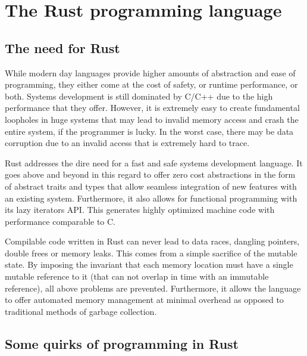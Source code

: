 
\chapter{The Rust programming language} %

\label{Chapter1} %



\section{The need for Rust}
While modern day languages provide higher amounts of abstraction and ease of programming, they either come at the cost of safety, or runtime performance, or both. Systems development is still dominated by C/C++ due to the high performance that they offer. However, it is extremely easy to create fundamental loopholes in huge systems that may lead to invalid memory access and crash the entire system, if the programmer is lucky. In the worst case, there may be data corruption due to an invalid access that is extremely hard to trace.

Rust addresses the dire need for a fast and safe systems development language. It goes above and beyond in this regard to offer zero cost abstractions in the form of abstract traits and types that allow seamless integration of new features with an existing system. Furthermore, it also allows for functional programming with its lazy iterators API. This generates highly optimized machine code with performance comparable to C.

Compilable code written in Rust can never lead to data races, dangling pointers, double frees or memory leaks. This comes from a simple sacrifice of the mutable state. By imposing the invariant that each memory location must have a single mutable reference to it (that can not overlap in time with an immutable reference), all above problems are prevented. Furthermore, it allows the language to offer automated memory management at minimal overhead as opposed to traditional methods of garbage collection.

\section{Some quirks of programming in Rust}

